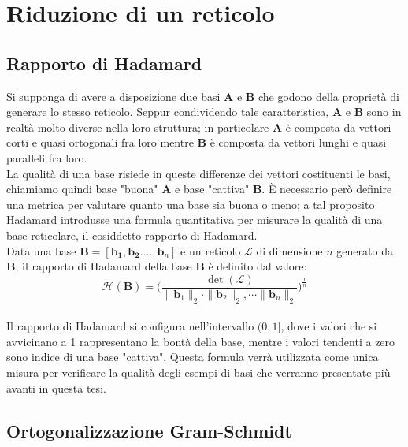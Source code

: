 \section{Riduzione di un reticolo}
\subsection{Rapporto di Hadamard}
\label{sec:hadamard}
Si supponga di avere a disposizione due basi $\mathbf{A}$ e $\mathbf{B}$ che godono della
proprietà di generare lo stesso reticolo. Seppur condividendo tale caratteristica, 
$\mathbf{A}$ e $\mathbf{B}$ sono in realtà molto diverse nella loro struttura; in particolare
$\mathbf{A}$ è composta da vettori corti e quasi ortogonali fra loro mentre $\mathbf{B}$ è
composta da vettori lunghi e quasi paralleli fra loro.\\
La qualità di una base risiede in queste differenze dei vettori costituenti le basi, chiamiamo
quindi base "buona" $\mathbf{A}$ e base "cattiva" $\mathbf{B}$.
È necessario però definire una metrica per valutare quanto una base sia buona o meno; a tal
proposito Hadamard\cite{HDMRD08} introdusse una formula quantitativa per misurare la qualità
di una base reticolare, il cosiddetto rapporto di Hadamard. \\

Data una base $\mathbf{B} = [\mathbf{b_1}, \mathbf{b_2}. \dots, \mathbf{b}_n]$ e un reticolo
$\mathcal{L}$ di dimensione $n$ generato da $\mathbf{B}$, il rapporto di Hadamard della base
$\mathbf{B}$ è definito dal valore:
\[
\mathcal{H}(\mathbf{B}) = 
    \Biggl( 
        \frac{\det(\mathcal{L})}
        {\|\mathbf{b}_1\|_2 \cdot \|\mathbf{b}_2\|_2, \cdots \|\mathbf{b}_n\|_2} 
    \Biggr)^{\frac{1}{n}}
\]
\\
Il rapporto di Hadamard si configura nell'intervallo $(0, 1]$, dove i valori che si avvicinano 
a 1 rappresentano la bontà della base, mentre i valori tendenti a zero sono indice di una
base "cattiva". Questa formula
verrà utilizzata come unica misura per verificare la qualità degli esempi di basi che verranno
presentate più avanti in questa tesi.

\subsection{Ortogonalizzazione Gram-Schmidt}
 

